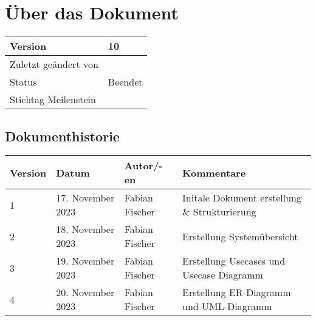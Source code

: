 \section{Über das Dokument}

\begin{table}[H]
  \begin{tabular}{|l|l|}
    \hline
   Version & 10 \\ \hline
   Zuletzt geändert von & \date{\today} \\ \hline
   Status & Beendet \\ \hline
   Stichtag Meilenstein &  \\ \hline
  \end{tabular}
\end{table}

\subsection{Dokumenthistorie}

\begin{table}[H]
  \begin{tabular}{|l|l|l|l|}
    \hline
   Version & Datum & Autor/-en & Kommentare \\ \hline
   1 & 17. November 2023 & Fabian Fischer & Initale Dokument erstellung \& Strukturierung \\ \hline
   2 & 18. November 2023 & Fabian Fischer & Erstellung Systemübersicht \\ \hline
   3 & 19. November 2023 & Fabian Fischer & Erstellung Usecases und Usecase Diagramm \\ \hline
   4 & 20. November 2023 & Fabian Fischer & Erstellung ER-Diagramm und UML-Diagramm \\ \hline
  \end{tabular}
\end{table}
